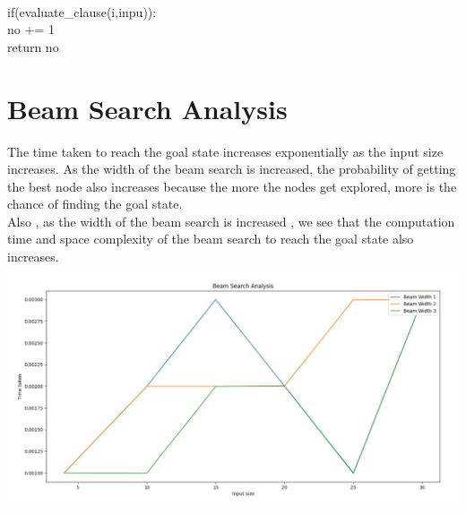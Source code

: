 \documentclass{article}
\begin{document}
            \vspace{2pt}
            \\ \hspace*{30pt}if(evaluate\_clause(i,inpu)):
            \vspace{2pt}
            \\ \hspace*{50pt} no += 1
            \vspace{2pt}
            \\ \hspace*{20pt} return no
\newpage
\section{Beam Search Analysis}
The time taken to reach the goal state increases exponentially as the input size increases.
As the width of the beam search is increased, the probability of getting the best node also increases because the more the
nodes get explored, more is the chance of finding the goal state.
\\Also , as the width of the beam search is increased , we see that the computation time and space complexity of the beam search to reach the goal state also increases.
\\\includegraphics[scale=0.3]{BeamSearch.jpg}
\newpage
\end{document}
